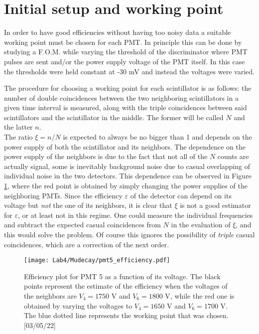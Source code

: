 \documentclass[10pt,a4paper,twocolumn]{article}
\begin{document}
\section{Initial setup and working point}

In order to have good efficiencies without having too noisy data a suitable working point must be chosen for each PMT. In principle this can be done by studying a F.O.M. while varying the threshold of the discriminator where PMT pulses are sent and/or the power supply voltage of the PMT itself. In this case the thresholds were held constant at -30 mV and instead the voltages were varied. 

The procedure for choosing a working point for each scintillator is as follows: the number of double coincidences between the two neighboring scintillators in a given time interval is measured, along with the triple coincidences between said scintillators and the scintillator in the middle. The former will be called $N$ and the latter $n$.
\\
The ratio $\xi=n/N$ is expected to always be no bigger than 1 and depends on the power supply of both the scintillator and its neighbors. The dependence on the power supply of the neighbors is due to the fact that not all of the $N$ counts are actually signal, some is inevitably background noise due to casual overlapping of individual noise in the two detectors. This dependence can be observed in Figure \ref{volteffdepend}, where the red point is obtained by simply changing the power supplies of the neighboring PMTs. Since the efficiency $\varepsilon$ of the detector can depend on its voltage but \textit{not} the one of its neighbors, it is clear that $\xi$ is not a good estimator for $\varepsilon$, or at least not in this regime. One could measure the individual frequencies and subtract the expected casual coincidences from $N$ in the evaluation of $\xi$, and this would solve the problem. Of course this ignores the possibility of \textit{triple} casual coincidences, which are a correction of the next order.

\begin{figure}[h!]
\centering
\texttt{[image: Lab4/Mudecay/pmt5\_efficiency.pdf]} 
\caption{Efficiency plot for PMT 5 as a function of its voltage. The black points represent the estimate of the efficiency when the voltages of the neighbors are $V_4 = 1750 $ V  and  $V_6 = 1800 $ V, while the red one is obtained by varying the voltages to  $V_4 = 1650 $ V  and  $V_6 = 1700 $ V. The blue dotted line represents the working point that was chosen. [03/05/22]}
\label{volteffdepend}
\end{figure}
\end{document}
